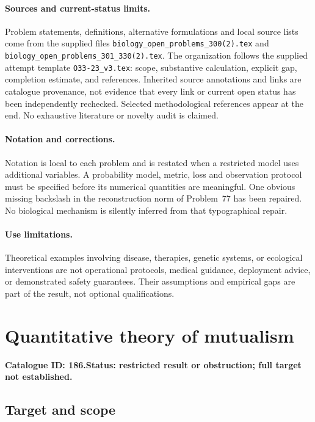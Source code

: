 \documentclass[11pt]{article}
\begin{document}
\paragraph{Sources and current-status limits.}
Problem statements, definitions, alternative formulations and local source lists
come from the supplied files
\texttt{biology\_open\_problems\_300(2).tex} and
\texttt{biology\_open\_problems\_301\_330(2).tex}.
The organization follows the supplied attempt template
\texttt{O33-23\_v3.tex}: scope, substantive calculation, explicit gap,
completion estimate, and references. Inherited source annotations and links are
catalogue provenance, not evidence that every link or current open status has
been independently rechecked. Selected methodological references appear at the
end. No exhaustive literature or novelty audit is claimed.

\paragraph{Notation and corrections.}
Notation is local to each problem and is restated when a restricted model uses
additional variables. A probability model, metric, loss and observation protocol
must be specified before its numerical quantities are meaningful. One obvious
missing backslash in the reconstruction norm of Problem~77 has been repaired.
No biological mechanism is silently inferred from that typographical repair.

\paragraph{Use limitations.}
Theoretical examples involving disease, therapies, genetic systems, or ecological
interventions are not operational protocols, medical guidance, deployment advice,
or demonstrated safety guarantees. Their assumptions and empirical gaps are part
of the result, not optional qualifications.

\setcounter{section}{185}
\section{Quantitative theory of mutualism}
\label{prob:186}
\noindent\textbf{Catalogue ID: 186.}\quad \textbf{Status: restricted result or obstruction; full target not established.}
\subsection{Target and scope}
\end{document}
